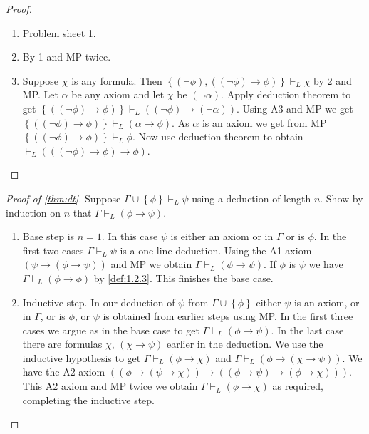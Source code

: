 \documentclass{article}
\newcommand{\rb}[1]{\left( #1 \right)}
\newcommand{\cb}[1]{\left\{ #1 \right\}}
\newcommand{\notb}[1]{\rb{\neg #1}}
\newcommand{\impb}[2]{\rb{#1 \rightarrow #2}}
\theoremstyle{definition}\newtheorem{definition}{Definition}[subsection]
\theoremstyle{definition}\newtheorem{remark}[definition]{Remark}
\theoremstyle{definition}\newtheorem*{example}{Example}
\theoremstyle{definition}\newtheorem*{note}{Note}
\begin{document}
\begin{proof}
\hfill
\begin{enumerate}
\item Problem sheet 1.
\item By 1 and MP twice.
\item Suppose $ \chi $ is any formula. Then $ \cb{\notb{\phi}, \impb{\notb{\phi}}{\phi}} \vdash_L \chi $ by 2 and MP. Let $ \alpha $ be any axiom and let $ \chi $ be $ \notb{\alpha} $. Apply deduction theorem to get $ \cb{\impb{\notb{\phi}}{\phi}} \vdash_L \impb{\notb{\phi}}{\notb{\alpha}} $. Using A3 and MP we get $ \cb{\impb{\notb{\phi}}{\phi}} \vdash_L \impb{\alpha}{\phi} $. As $ \alpha $ is an axiom we get from MP $ \cb{\impb{\notb{\phi}}{\phi}} \vdash_L \phi $. Now use deduction theorem to obtain $ \vdash_L \impb{\impb{\notb{\phi}}{\phi}}{\phi} $.
\end{enumerate}
\end{proof}

\begin{proof}[Proof of \ref{thm:dt}]
Suppose $ \Gamma \cup \cb{\phi} \vdash_L \psi $ using a deduction of length $ n $. Show by induction on $ n $ that $ \Gamma \vdash_L \impb{\phi}{\psi} $.
\begin{enumerate}
\item Base step is $ n = 1 $. In this case $ \psi $ is either an axiom or in $ \Gamma $ or is $ \phi $. In the first two cases $ \Gamma \vdash_L \psi $ is a one line deduction. Using the A1 axiom $ \impb{\psi}{\impb{\phi}{\psi}} $ and MP we obtain $ \Gamma \vdash_L \impb{\phi}{\psi} $. If $ \phi $ is $ \psi $ we have $ \Gamma \vdash_L \impb{\phi}{\phi} $ by \ref{def:1.2.3}. This finishes the base case.
\item Inductive step. In our deduction of $ \psi $ from $ \Gamma \cup \cb{\phi} $ either $ \psi $ is an axiom, or in $ \Gamma $, or is $ \phi $, or $ \psi $ is obtained from earlier steps using MP. In the first three cases we argue as in the base case to get $ \Gamma \vdash_L \impb{\phi}{\psi} $. In the last case there are formulas $ \chi $, $ \impb{\chi}{\psi} $ earlier in the deduction. We use the inductive hypothesis to get $ \Gamma \vdash_L \impb{\phi}{\chi} $ and $ \Gamma \vdash_L \impb{\phi}{\impb{\chi}{\psi}} $. We have the A2 axiom $ \impb{\impb{\phi}{\impb{\psi}{\chi}}}{\impb{\impb{\phi}{\psi}}{\impb{\phi}{\chi}}} $. This A2 axiom and MP twice we obtain $ \Gamma \vdash_L \impb{\phi}{\chi} $ as required, completing the inductive step.
\end{enumerate}
\end{proof}
\end{document}

